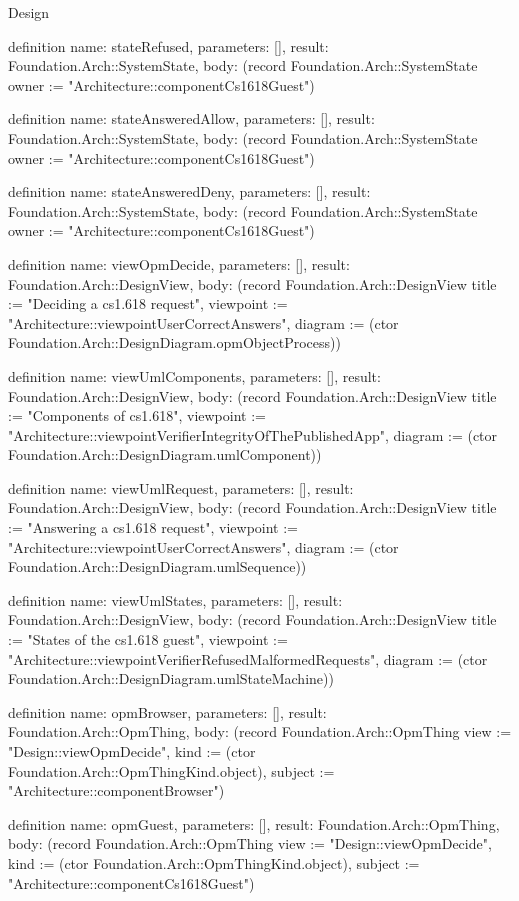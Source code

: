\begin{lexlean}{Design}
\begin{semanticmodule}
definition{
  name: stateRefused,
  parameters: [],
  result: Foundation.Arch::SystemState,
  body: (record Foundation.Arch::SystemState {owner := "Architecture::componentCs1618Guest"})
}

definition{
  name: stateAnsweredAllow,
  parameters: [],
  result: Foundation.Arch::SystemState,
  body: (record Foundation.Arch::SystemState {owner := "Architecture::componentCs1618Guest"})
}

definition{
  name: stateAnsweredDeny,
  parameters: [],
  result: Foundation.Arch::SystemState,
  body: (record Foundation.Arch::SystemState {owner := "Architecture::componentCs1618Guest"})
}

definition{
  name: viewOpmDecide,
  parameters: [],
  result: Foundation.Arch::DesignView,
  body: (record Foundation.Arch::DesignView {title := "Deciding a cs1.618 request", viewpoint := "Architecture::viewpointUserCorrectAnswers", diagram := (ctor Foundation.Arch::DesignDiagram.opmObjectProcess)})
}

definition{
  name: viewUmlComponents,
  parameters: [],
  result: Foundation.Arch::DesignView,
  body: (record Foundation.Arch::DesignView {title := "Components of cs1.618", viewpoint := "Architecture::viewpointVerifierIntegrityOfThePublishedApp", diagram := (ctor Foundation.Arch::DesignDiagram.umlComponent)})
}

definition{
  name: viewUmlRequest,
  parameters: [],
  result: Foundation.Arch::DesignView,
  body: (record Foundation.Arch::DesignView {title := "Answering a cs1.618 request", viewpoint := "Architecture::viewpointUserCorrectAnswers", diagram := (ctor Foundation.Arch::DesignDiagram.umlSequence)})
}

definition{
  name: viewUmlStates,
  parameters: [],
  result: Foundation.Arch::DesignView,
  body: (record Foundation.Arch::DesignView {title := "States of the cs1.618 guest", viewpoint := "Architecture::viewpointVerifierRefusedMalformedRequests", diagram := (ctor Foundation.Arch::DesignDiagram.umlStateMachine)})
}

definition{
  name: opmBrowser,
  parameters: [],
  result: Foundation.Arch::OpmThing,
  body: (record Foundation.Arch::OpmThing {view := "Design::viewOpmDecide", kind := (ctor Foundation.Arch::OpmThingKind.object), subject := "Architecture::componentBrowser"})
}

definition{
  name: opmGuest,
  parameters: [],
  result: Foundation.Arch::OpmThing,
  body: (record Foundation.Arch::OpmThing {view := "Design::viewOpmDecide", kind := (ctor Foundation.Arch::OpmThingKind.object), subject := "Architecture::componentCs1618Guest"})
}


\end{semanticmodule}
\end{lexlean}
